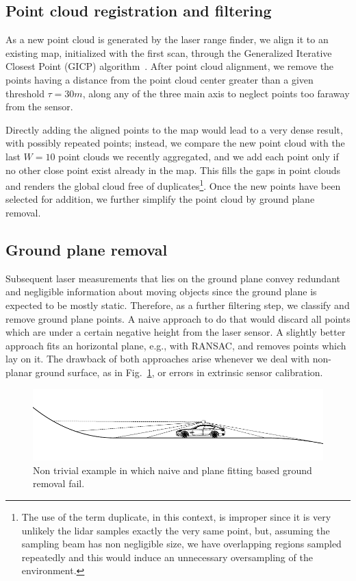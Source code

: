 \subsection{Point cloud registration and filtering}
As a new point cloud is generated by the laser range finder, we align it to an existing map, initialized with the first scan, through the Generalized Iterative Closest Point (GICP) algorithm~\cite{segal2009generalized}.
%
After point cloud alignment, we remove the points having a distance from the point cloud center greater than a given threshold $\tau = 30m$, along any of the three main axis to neglect points too faraway from the sensor.

Directly adding the aligned points to the map would lead to a very dense result, with possibly repeated points; instead, we compare the new point cloud with the last $W = 10$ 
point clouds we recently aggregated, and we add each point only if no other close point exist already in the map. This fills the gaps in point clouds and renders the global cloud free of duplicates\footnote{The use of the term duplicate, in this context, is improper since it is very unlikely the lidar samples exactly the very same point, but, assuming the sampling beam has non negligible size, we have overlapping regions sampled repeatedly and this would induce an unnecessary oversampling of the environment.}. Once the new points have been selected for addition, we further simplify the point cloud by ground plane removal.


\subsection{Ground plane removal}
\label{sec:ground_removal}
Subsequent laser measurements that lies on the ground plane convey redundant and negligible information about moving objects since the ground plane is expected to be mostly static. Therefore, as a further filtering step, we classify and remove ground plane points. 
A naive approach to do that would discard all points which are under a certain negative height from the laser sensor. 
A slightly better approach fits an horizontal plane, e.g., with RANSAC, and removes points which lay on it.
The drawback of both approaches arise whenever we deal with non-planar ground surface, as in Fig.~\ref{fig:nonplane}, or errors in extrinsic sensor calibration.

\begin{figure}
\includegraphics[width=\columnwidth]{./img/ch-laser/./non-plane}
\caption{Non trivial example in which naive and plane fitting based ground removal fail.}
\label{fig:nonplane}
\end{figure}

